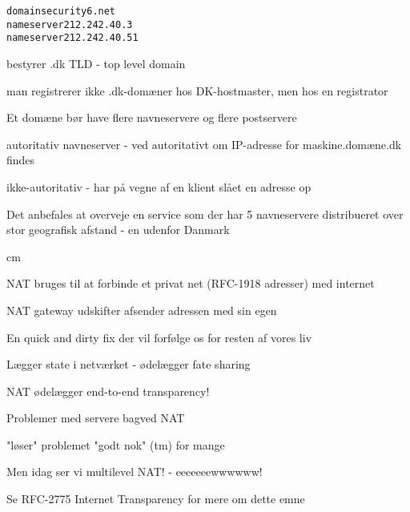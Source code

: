 \documentclass[Screen16to9,17pt]{foils}
\begin{document}
\begin{alltt}
domain security6.net
nameserver 212.242.40.3
nameserver 212.242.40.51
\end{alltt}





\begin{list1}
\item bestyrer .dk TLD - top level domain

\item man registrerer ikke .dk-domæner hos DK-hostmaster, men hos en
  registrator
\item Et domæne bør have flere navneservere og flere postservere
\item autoritativ navneserver - ved autoritativt om IP-adresse for
  maskine.domæne.dk findes
\item ikke-autoritativ - har på vegne af en klient slået en adresse op
\item Det anbefales at overveje en service som
   der har 5 navneservere distribueret
  over stor geografisk afstand - en udenfor Danmark
\end{list1}



 cm
\begin{list2}
\item NAT bruges til at forbinde et privat net (RFC-1918 adresser) med internet
\item NAT gateway udskifter afsender adressen med sin egen
\item En quick and dirty fix der vil forfølge os for resten af vores
  liv
\item Lægger state i netværket - ødelægger fate sharing
\end{list2}



\begin{list2}
\item NAT ødelægger end-to-end transparency!
\item Problemer med servere bagved NAT
\item "løser" problemet "godt nok" (tm) for mange
\item Men idag ser vi multilevel NAT! - eeeeeeewwwwww!
\item Se RFC-2775 Internet Transparency for mere om dette emne
\end{list2}
\end{document}
